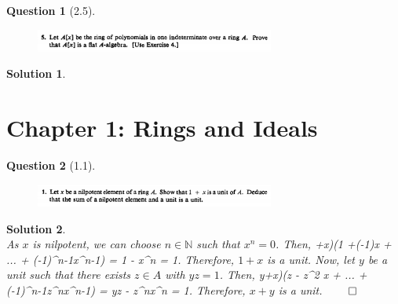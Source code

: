 \documentclass[11pt]{article}
\theoremstyle{plain}
\def\eQb#1\eQe{\begin{eqnarray*}#1\end{eqnarray*}}
\theoremstyle{quest}
\newtheorem*{question}{Question}
\newtheorem*{solution}{Solution}
\begin{document}
\bigskip

\begin{question}[2.5]
\hfill
\begin{figure}[h!]
  \centering
    \includegraphics[width=0.7\textwidth]{d-2-5.png}
\end{figure}
\end{question}
\begin{solution} \hfill \\

\end{solution}

\newpage

\section{Chapter 1: Rings and Ideals} \label{sec:RaI}

\begin{question}[1.1]
\hfill
\begin{figure}[h!]
  \centering
    \includegraphics[width=0.7\textwidth]{d-1-1.png}
\end{figure}
\end{question}
\begin{solution} \hfill \\
As $x$ is nilpotent, we can choose $n \in \mathbb{N}$ such that $x^n = 0$.
Then,
\eQb
(1+x)(1 +(-1)x + ... + (-1)^{n-1}x^{n-1}) = 1 - x^{n} = 1.
\eQe
Therefore, $1+x$ is a unit. Now, let $y$ be a unit such that there exists $z \in
A$ with $yz = 1$. Then, 
\eQb
(y+x)(z - z^2 x + ... + (-1)^{n-1}z^{n}x^{n-1}) = yz - z^{n}x^{n} = 1.
\eQe
Therefore, $x+y$ is a unit. \hfill $\qed$

\end{solution}

\bigskip
\end{document}
